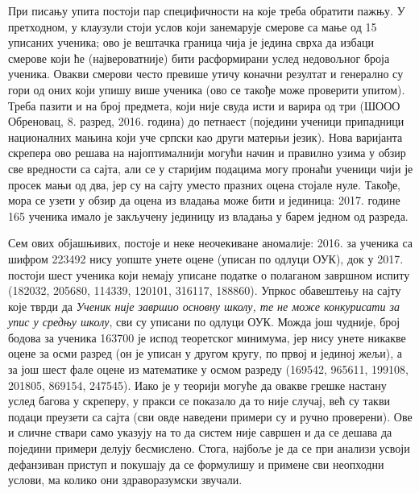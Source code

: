 При писању упита постоји пар специфичности на које треба обратити пажњу. У претходном, у  клаузули стоји услов који занемарује смерове са мање од 15 уписаних ученика; ово је вештачка граница чија је једина сврха да избаци смерове који ће (највероватније) бити расформирани услед недовољног броја ученика. Овакви смерови често превише утичу коначни резултат и генерално су гори од оних који упишу више ученика (ово се такође може проверити упитом). Треба пазити и на број предмета, који није свуда исти и варира од три (ШООО Обреновац, 8. разред, 2016. година) до петнаест (поједини ученици припадници националних мањина који уче српски као други матерњи језик). Нова варијанта скрепера ово решава на најоптималнији могући начин и правилно узима у обзир све вредности са сајта, али се у старијим подацима могу пронаћи ученици чији је просек мањи од два, јер су на сајту уместо празних оцена стојале нуле. Такође, мора се узети у обзир да оцена из владања може бити и јединица: 2017. године 165 ученика имало је закључену јединицу из владања у барем једном од разреда.

Сем ових објашњивих, постоје и неке неочекиване аномалије: 2016. за ученика са шифром 223492 нису уопште унете оцене (уписан по одлуци ОУК), док у 2017. постоји шест ученика који немају уписане податке о полаганом завршном испиту (182032, 205680, 114339, 120101, 316117, 188860). Упркос обавештењу на сајту које тврди да \emph{Ученик није завршио основну школу, те не може конкурисати за упис у средњу школу}, сви су уписани по одлуци ОУК. Можда још чудније, број бодова за ученика 163700 је испод теоретског минимума, јер нису унете никакве оцене за осми разред (он је уписан у другом кругу, по првој и јединој жељи), а за још шест фале оцене из математике у осмом разреду (169542, 965611, 199108, 201805, 869154, 247545). Иако је у теорији могуће да овакве грешке настану услед багова у скреперу, у пракси се показало да то није случај, већ су такви подаци преузети са сајта (сви овде наведени примери су и ручно проверени). Ове и сличне ствари само указују на то да систем није савршен и да се дешава да поједини примери делују бесмислено. Стога, најбоље је да се при анализи усвоји дефанзиван приступ и покушају да се формулишу и примене сви неопходни услови, ма колико они здраворазумски звучали.